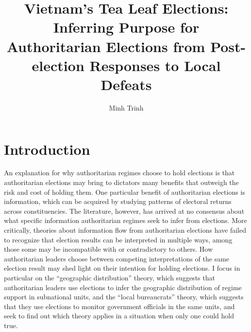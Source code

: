 \documentclass[12pt]{article}\usepackage[]{graphicx}\usepackage[]{color}
\title{Vietnam's Tea Leaf Elections: \\
	Inferring Purpose for Authoritarian Elections from Post-election Responses to Local Defeats}
\author{Minh Trinh}
\newcommand{\1}{\mathbbm{1}}
\begin{document}
\maketitle

\doublespacing

\section{Introduction}

An explanation for why authoritarian regimes choose to hold elections is that authoritarian elections may bring to dictators many benefits that outweigh the risk and cost of holding them. One particular benefit of authoritarian elections is information, which can be acquired by studying patterns of electoral returns across constituencies. The literature, however, has arrived at no consensus about what specific information authoritarian regimes seek to infer from elections. More critically, theories about information flow from authoritarian elections have failed to recognize that election results can be interpreted in multiple ways, among those some may be incompatible with or contradictory to others. How authoritarian leaders choose between competing interpretations of the same election result may shed light on their intention for holding elections. I focus in particular on the ``geographic distribution'' theory, which suggests that authoritarian leaders use elections to infer the geographic distribution of regime support in subnational units, and the ``local bureaucrats'' theory, which suggests that they use elections to monitor government officials in the same units, and seek to find out which theory applies in a situation when only one could hold true.
\end{document}
